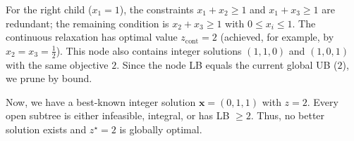 \begin{exampleBox}
    For the right child ($x_1=1$), the constraints $x_1{+}x_2\ge 1$ and $x_1{+}x_3\ge 1$ are redundant; the remaining condition is $x_2{+}x_3\ge 1$ with $0\le x_i\le 1$. The continuous relaxation has optimal value $z_{\mathrm{cont}}=2$ (achieved, for example, by $x_2=x_3=\tfrac12$). This node also contains integer solutions $(1,1,0)$ and $(1,0,1)$ with the same objective $2$. Since the node LB equals the current global UB ($2$), we prune by bound.

    
    Now, we have a best-known integer solution $\mathbf{x}=(0,1,1)$ with $z=2$. Every open subtree is either infeasible, integral, or has LB $\ge 2$. Thus, no better solution exists and $z^\star=2$ is globally optimal.
    
    {
    \def\rootMIP{$\min\ x_1{+}x_2{+}x_3$\\
    subject to\\
    \hspace{0.6em}$x_1{+}x_2\ge 1$\\
    \hspace{0.6em}$x_2{+}x_3\ge 1$\\
    \hspace{0.6em}$x_1{+}x_3\ge 1$\\
    \hspace{0.6em}$x_i\in\{0,1\}$}
    
    \def\rootLP{$\min\ x_1{+}x_2{+}x_3$\\
    subject to (continuous relaxation)\\
    \hspace{0.6em}$x_1{+}x_2\ge 1$,\ $x_2{+}x_3\ge 1$\\
    \hspace{0.6em}$x_1{+}x_3\ge 1$,\ $0\le x_i\le 1$\\
    \nodepart{two}
    {\scriptsize $\mathbf{x}^\star_{\mathrm{cont}}=(\tfrac12,\tfrac12,\tfrac12)$,\ $z_{\mathrm{cont}}=\tfrac32$ (continuous relaxation)}
    }
    
    \def\nodeLeft{$x_1=0$ subproblem\\
    $\Rightarrow$ constraints force $x_2=1,\ x_3=1$\\
    \nodepart{two}
    {\scriptsize integral: $\mathbf{x}=(0,1,1)$,\ $z=2$ $\Rightarrow$ best known integer solution $z^\star=2$}
    }
    
    \def\nodeRight{$x_1=1$ subproblem\\
    Constraints $x_1{+}x_2\ge1$ and $x_1{+}x_3\ge1$ are redundant;\\
    remaining: $x_2{+}x_3\ge1$, $0\le x_i\le1$\\
    \nodepart{two}
    {\scriptsize Continuous optimum $z_{\mathrm{cont}}=2$ (e.g., $x_2{=}x_3{=}\tfrac{1}{2}$).\\
    LB $=2 \ge$ UB $=2$ $\Rightarrow$ prune by bound}
    }
    
}
\end{exampleBox}
